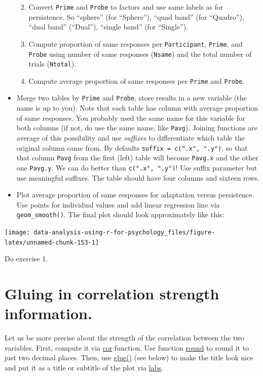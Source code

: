 \documentclass[
]{book}
\providecommand{\tightlist}{%
  \setlength{\itemsep}{0pt}\setlength{\parskip}{0pt}}
\begin{document}
\begin{itemize}
  \begin{enumerate}
  \def\labelenumi{\arabic{enumi}.}
  \tightlist
  \item
    Convert \texttt{Prime} and \texttt{Probe} to factors and use same labels as for persistence. So ``sphere'' (for ``Sphere''), ``quad band'' (for ``Quadro''), ``dual band'' (``Dual''), ``single band'' (for ``Single'').
  \item
    Compute proportion of same responses per \texttt{Participant}, \texttt{Prime}, and \texttt{Probe} using number of same responses (\texttt{Nsame}) and the total number of trials (\texttt{Ntotal}).
  \item
    Compute average proportion of same responses per \texttt{Prime} and \texttt{Probe}.
  \end{enumerate}
\item
  Merge two tables by \texttt{Prime} and \texttt{Probe}, store results in a new variable (the name is up to you). Note that each table has column with average proportion of same responses. You probably used the same name for this variable for both columns (if not, do use the same name, like \texttt{Pavg}). Joining functions are average of this possibility and use \emph{suffixes} to differentiate which table the original column came from. By defaults \texttt{suffix\ =\ c(".x",\ ".y")}, so that that column \texttt{Pavg} from the first (left) table will become \texttt{Pavg.x} and the other one \texttt{Pavg.y}. We can do better than \texttt{c(".x",\ ".y")}! Use suffix parameter but use meaningful suffixes. The table should have four columns and sixteen rows.
\item
  Plot average proportion of same responses for adaptation versus persistence. Use points for individual values and add linear regression line via \texttt{geom\_smooth()}. The final plot should look approximately like this:
\end{itemize}

\begin{center}\texttt{[image: data-analysis-using-r-for-psychology\_files/figure-latex/unnamed-chunk-153-1]} \end{center}

Do exercise 1.

\hypertarget{glue}{%
\section{Gluing in correlation strength information.}\label{glue}}

Let us be more precise about the strength of the correlation between the two variables. First, compute it via \href{https://stat.ethz.ch/R-manual/R-patched/library/stats/html/cor.html}{cor} function. Use function \href{https://stat.ethz.ch/R-manual/R-patched/library/base/html/Round.html}{round} to round it to just two decimal places. Then, use \href{https://glue.tidyverse.org/}{glue()} (see below) to make the title look nice and put it as a title or subtitle of the plot via \href{https://ggplot2.tidyverse.org/reference/labs.html}{labs}.
\end{document}
